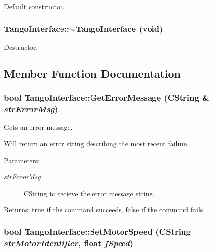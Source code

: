 Default constructor. 

\hypertarget{classTangoInterface_6af2d055005412be8ad30be0eada083b}{
\subsubsection[$\sim$TangoInterface]{\setlength{\rightskip}{0pt plus 5cm}TangoInterface::$\sim$TangoInterface (void)}}
\label{classTangoInterface_6af2d055005412be8ad30be0eada083b}


Destructor. 



\subsection{Member Function Documentation}
\hypertarget{classTangoInterface_e4c5af1c2055bdd253eddce0babd9158}{
\subsubsection[GetErrorMessage]{\setlength{\rightskip}{0pt plus 5cm}bool TangoInterface::GetErrorMessage (CString \& {\em strErrorMsg})}}
\label{classTangoInterface_e4c5af1c2055bdd253eddce0babd9158}


Gets an error message. 

Will return an error string describing the most recent failure.

\begin{Desc}
\item[Parameters:]
\begin{description}
\item[{\em strErrorMsg}]CString to recieve the error message string. \end{description}
\end{Desc}


\begin{Desc}
\item[Returns:]true if the command succeeds, false if the command fails. \end{Desc}
\hypertarget{classTangoInterface_45f902f0d486ff896b49de74d2e60a02}{
\subsubsection[SetMotorSpeed]{\setlength{\rightskip}{0pt plus 5cm}bool TangoInterface::SetMotorSpeed (CString {\em strMotorIdentifier}, \/  float {\em fSpeed})}}
\label{classTangoInterface_45f902f0d486ff896b49de74d2e60a02}


